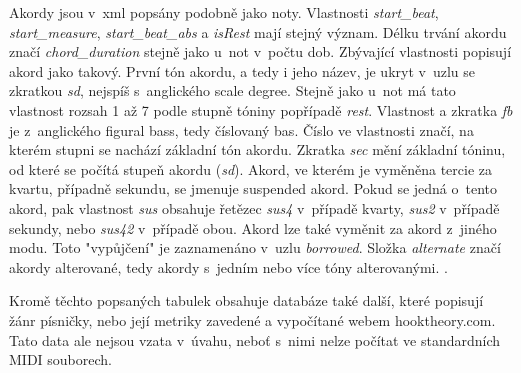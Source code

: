Akordy jsou v~xml popsány podobně jako noty.
Vlastnosti \emph{start\_beat}, \emph{start\_measure}, \emph{start\_beat\_abs}
a \emph{isRest} mají stejný význam.
Délku trvání akordu značí \emph{chord\_duration} stejně jako u~not v~počtu dob.
Zbývající vlastnosti popisují akord jako takový.
První tón akordu, a tedy i jeho název, 
je ukryt v~uzlu se zkratkou \emph{sd},
nejspíš s~anglického scale degree.
Stejně jako u~not má tato vlastnost rozsah 1 až 7 podle stupně tóniny 
popřípadě \emph{rest}.
Vlastnost a zkratka \emph{fb} je z~anglického figural bass, 
tedy číslovaný bas. 
Číslo ve vlastnosti značí, 
na kterém stupni se nachází základní tón akordu\cite{kofron}.
Zkratka \emph{sec} mění základní tóninu,
od které se počítá stupeň akordu (\emph{sd}).
Akord, ve kterém je vyměněna tercie za kvartu, případně sekundu,
se jmenuje suspended akord.
Pokud se jedná o~tento akord, 
pak vlastnost \emph{sus} obsahuje řetězec \emph{sus4} v~případě kvarty,
\emph{sus2} v~případě sekundy, nebo \emph{sus42} v~případě obou\cite{SimplifyingSuspended}.
Akord lze také vyměnit za akord z~jiného modu.
Toto "vypůjčení" je zaznamenáno v~uzlu \emph{borrowed}.
Složka \emph{alternate} značí akordy alterované, 
tedy akordy s~jedním nebo více tóny alterovanými.
\cite{SzkanderaAlterovane}.
\par
Kromě těchto popsaných tabulek obsahuje databáze také další,
které popisují žánr písničky, 
nebo její metriky zavedené a vypočítané webem hooktheory.com.
Tato data ale nejsou vzata v~úvahu, 
neboť s~nimi nelze počítat ve standardních MIDI souborech.

